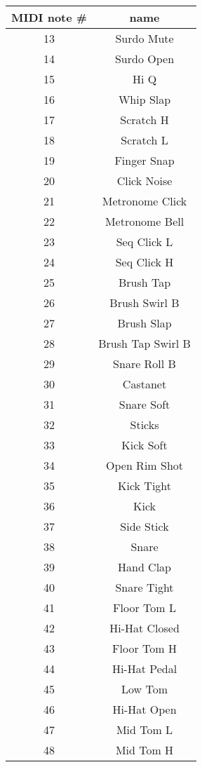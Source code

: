 \documentclass[titlepage]{article}
\newcommand{\futatsutomoe}{{\fontspec[RawFeature=+ornm]{TsukurimashouMinchoPS}B}}
\begin{document}
\begin{tabular}{cc}
  MIDI note \# & name \\ \hline
  13 & Surdo Mute \\
  14 & Surdo Open \\
  15 & Hi Q \\
  16 & Whip Slap \\
  17 & Scratch H \\
  18 & Scratch L \\
  19 & Finger Snap \\
  20 & Click Noise \\
  21 & Metronome Click \\
  22 & Metronome Bell \\
  23 & Seq Click L \\
  24 & Seq Click H \\
  25 & Brush Tap \\
  26 & Brush Swirl \futatsutomoe \\
  27 & Brush Slap \\
  28 & Brush Tap Swirl \futatsutomoe \\
  29 & Snare Roll \futatsutomoe \\
  30 & Castanet \\
  31 & Snare Soft \\
  32 & Sticks \\
  33 & Kick Soft \\
  34 & Open Rim Shot \\
  35 & Kick Tight \\
  36 & Kick \\
  37 & Side Stick \\
  38 & Snare \\
  39 & Hand Clap \\
  40 & Snare Tight \\
  41 & Floor Tom L \\
  42 & Hi-Hat Closed \\
  43 & Floor Tom H \\
  44 & Hi-Hat Pedal \\
  45 & Low Tom \\
  46 & Hi-Hat Open \\
  47 & Mid Tom L \\
  48 & Mid Tom H
\end{tabular}\qquad
\end{document}
